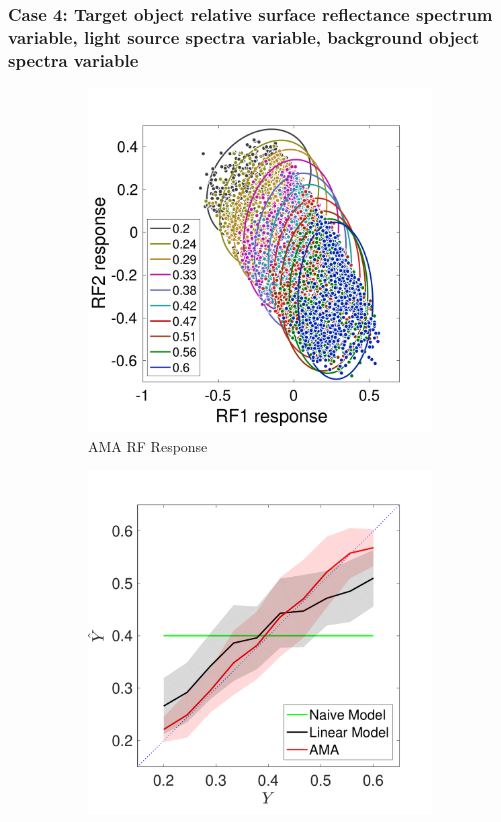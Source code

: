 \documentclass{jov}
\begin{document}
\subsubsection{Case 4: Target object relative surface reflectance spectrum variable, light source spectra variable, background object spectra variable}
\begin{figure}
\centering
    \begin{subfigure}[b]{0.3 \textwidth}   
        \includegraphics[width=\textwidth]{../Figures/Figure13/Figure13_a.pdf}
        \caption{AMA RF Response}
        \label{fig:case12FiltersResponse}
    \end{subfigure}    
        \begin{subfigure}[b]{0.3 \textwidth}
        \includegraphics[width=\textwidth]{../Figures/Figure13/Figure13_b.pdf}

\end{subfigure}
\end{figure}
\end{document}
